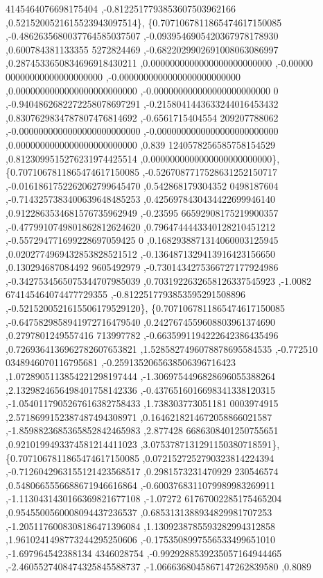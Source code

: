 \begin{DoxyCode}
      4145464076698175404 ,-0.8122517793853607503962166 ,0.5215200521615523943097514\},
\{0.7071067811865474617150085 ,-0.4862635680037764585037507 ,-0.0939546905420367978178930 ,0.600784381133355
      5272824469 ,-0.6822029902691008063086997 ,0.2874533650834696918430211 ,0.0000000000000000000000000 ,-0.00000
      00000000000000000000 ,-0.0000000000000000000000000 ,0.0000000000000000000000000 ,-0.000000000000000000000000
      0 ,-0.9404862682272258078697291 ,-0.2158041443633244016453432 ,0.8307629834787807476814692 ,-0.6561715404554
      209207788062 ,-0.0000000000000000000000000 ,-0.0000000000000000000000000 ,0.0000000000000000000000000 ,0.839
      1240578256585758154529 ,0.8123099515276231974425514 ,0.0000000000000000000000000\},
\{0.7071067811865474617150085 ,-0.5267087717528631252150717 ,-0.0161861752262062799645470 ,0.542868179304352
      0498187604 ,-0.7143257383400639648485253 ,0.4256978430434422699946140 ,0.9122863534681576735962949 ,-0.23595
      66592908175219900357 ,-0.4779910749801862812624620 ,0.7964744443340128210451212 ,-0.557294771699228697059425
      0 ,0.1682938871314060003125945 ,0.0202774969432853828521512 ,-0.1364871329413916423156650 ,0.130294687084492
      9605492979 ,-0.7301434275366727177924986 ,-0.3427534565075344707985039 ,0.7031922632658126337545923 ,-1.0082
      674145464074477729355 ,-0.8122517793853595291508896 ,-0.5215200521615506179529120\},
\{0.7071067811865474617150085 ,-0.6475829858941972716479540 ,0.2427674559608803961374690 ,0.2797801249557416
      713997782 ,-0.6635991194222642386435496 ,0.7269364136962782607653821 ,1.5285827496078878695584535 ,-0.772510
      0348946070116795681 ,-0.2591352065638506396716423 ,1.0728905113854221298197444 ,-1.3069754496828696055388264
       ,2.1329824656498401758142336 ,-0.4376516016698341338120315 ,-1.0540117905267616382758433 ,1.738303773051181
      0003974915 ,2.5718699152387487494308971 ,0.1646218214672058866021587 ,-1.8598823685365852842465983 ,2.877428
      6686308401250755651 ,0.9210199493374581214411023 ,3.0753787131291150380718591\},
\{0.7071067811865474617150085 ,0.0721527252790323814224394 ,-0.7126042963155121423568517 ,0.2981573231470929
      230546574 ,0.5480665556688671946616864 ,-0.6003768311079989983269911 ,-1.1130431430166369821677108 ,-1.07272
      61767002285175465204 ,0.9545500560008094437236537 ,0.6853131388934829981707253 ,-1.2051176008308186471396084
       ,1.1309238785593282994312858 ,1.9610241498773244295250606 ,-0.1753508997556533499651010 ,-1.697964542388134
      4346028754 ,-0.9929288539235057164944465 ,-2.4605527408474325845588737 ,-1.0666368045867147262839580 ,0.8089

\end{DoxyCode}
